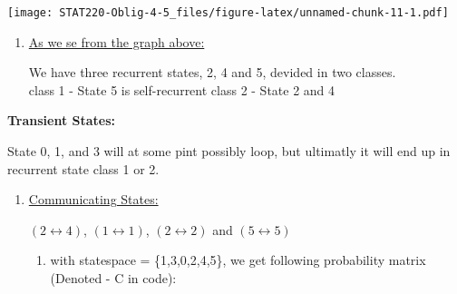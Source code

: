 \documentclass[]{article}
\newenvironment{Shaded}{\begin{snugshade}}{\end{snugshade}}
\newcommand{\DataTypeTok}[1]{\textcolor[rgb]{0.13,0.29,0.53}{#1}}
\newcommand{\DecValTok}[1]{\textcolor[rgb]{0.00,0.00,0.81}{#1}}
\newcommand{\FloatTok}[1]{\textcolor[rgb]{0.00,0.00,0.81}{#1}}
\newcommand{\KeywordTok}[1]{\textcolor[rgb]{0.13,0.29,0.53}{\textbf{#1}}}
\newcommand{\NormalTok}[1]{#1}
\newcommand{\OperatorTok}[1]{\textcolor[rgb]{0.81,0.36,0.00}{\textbf{#1}}}
\newcommand{\OtherTok}[1]{\textcolor[rgb]{0.56,0.35,0.01}{#1}}
\newcommand{\StringTok}[1]{\textcolor[rgb]{0.31,0.60,0.02}{#1}}
\providecommand{\tightlist}{%
  \setlength{\itemsep}{0pt}\setlength{\parskip}{0pt}}
\begin{document}
\begin{Shaded}
\end{Shaded}

\texttt{[image: STAT220-Oblig-4-5\_files/figure-latex/unnamed-chunk-11-1.pdf]}

\newpage

\begin{enumerate}
\def\labelenumi{\alph{enumi})}
\setcounter{enumi}{1}
\item
  \underline{As we se from the graph above:}

  We have three recurrent states, 2, 4 and 5, devided in two classes.\\
  class 1 - State 5 is self-recurrent class 2 - State 2 and 4
\end{enumerate}

\textbf{Transient States:}

State 0, 1, and 3 will at some pint possibly loop, but ultimatly it will
end up in recurrent state class 1 or 2.

\begin{enumerate}
\def\labelenumi{\alph{enumi})}
\setcounter{enumi}{2}
\item
  \underline{Communicating States:}

  \((2\leftrightarrow{4})\), \((1\leftrightarrow{1})\),
  \((2\leftrightarrow{2})\) and \((5\leftrightarrow{5})\)

  \begin{enumerate}
  \def\labelenumii{\alph{enumii})}
  \setcounter{enumii}{3}
  \tightlist
  \item
    with statespace = \{1,3,0,2,4,5\}, we get following probability
    matrix (Denoted - C in code):
  \end{enumerate}
\end{enumerate}
\end{document}
